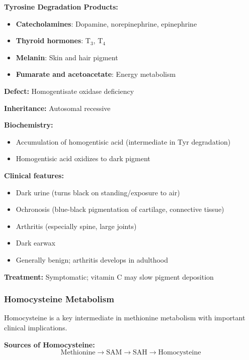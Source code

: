 \textbf{Tyrosine Degradation Products:}
\begin{itemize}
    \item \textbf{Catecholamines}: Dopamine, norepinephrine, epinephrine
    \item \textbf{Thyroid hormones}: T$_3$, T$_4$
    \item \textbf{Melanin}: Skin and hair pigment
    \item \textbf{Fumarate and acetoacetate}: Energy metabolism
\end{itemize}

\begin{tcolorbox}[colback=red!5, colframe=red!70!black, title=\textbf{Clinical Correlation: Alkaptonuria}]
\textbf{Defect:} Homogentisate oxidase deficiency

\textbf{Inheritance:} Autosomal recessive

\textbf{Biochemistry:}
\begin{itemize}
    \item Accumulation of homogentisic acid (intermediate in Tyr degradation)
    \item Homogentisic acid oxidizes to dark pigment
\end{itemize}

\textbf{Clinical features:}
\begin{itemize}
    \item Dark urine (turns black on standing/exposure to air)
    \item Ochronosis (blue-black pigmentation of cartilage, connective tissue)
    \item Arthritis (especially spine, large joints)
    \item Dark earwax
    \item Generally benign; arthritis develops in adulthood
\end{itemize}

\textbf{Treatment:} Symptomatic; vitamin C may slow pigment deposition
\end{tcolorbox}

\subsubsection{Homocysteine Metabolism}

Homocysteine is a key intermediate in methionine metabolism with important clinical implications.

\textbf{Sources of Homocysteine:}
\[
\text{Methionine} \rightarrow \text{SAM} \rightarrow \text{SAH} \rightarrow \text{Homocysteine}
\]

